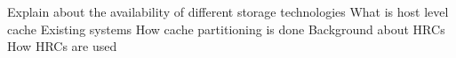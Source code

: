 Explain about the availability of different storage technologies
What is host level cache
    Existing systems
        How cache partitioning is done
        Background about HRCs
        How HRCs are used

